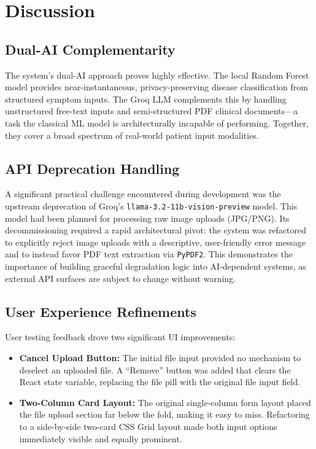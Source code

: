 \section{Discussion}

\subsection{Dual-AI Complementarity}
The system's dual-AI approach proves highly effective. The local Random Forest model provides near-instantaneous, privacy-preserving disease classification from structured symptom inputs. The Groq LLM complements this by handling unstructured free-text inputs and semi-structured PDF clinical documents---a task the classical ML model is architecturally incapable of performing. Together, they cover a broad spectrum of real-world patient input modalities.

\subsection{API Deprecation Handling}
A significant practical challenge encountered during development was the upstream deprecation of Groq's \texttt{llama-3.2-11b-vision-preview} model. This model had been planned for processing raw image uploads (JPG/PNG). Its decommissioning required a rapid architectural pivot: the system was refactored to explicitly reject image uploads with a descriptive, user-friendly error message and to instead favor PDF text extraction via \texttt{PyPDF2}. This demonstrates the importance of building graceful degradation logic into AI-dependent systems, as external API surfaces are subject to change without warning.

\subsection{User Experience Refinements}
User testing feedback drove two significant UI improvements:
\begin{itemize}
    \item \textbf{Cancel Upload Button:} The initial file input provided no mechanism to deselect an uploaded file. A ``Remove'' button was added that clears the React state variable, replacing the file pill with the original file input field.
    \item \textbf{Two-Column Card Layout:} The original single-column form layout placed the file upload section far below the fold, making it easy to miss. Refactoring to a side-by-side two-card CSS Grid layout made both input options immediately visible and equally prominent.
\end{itemize}

